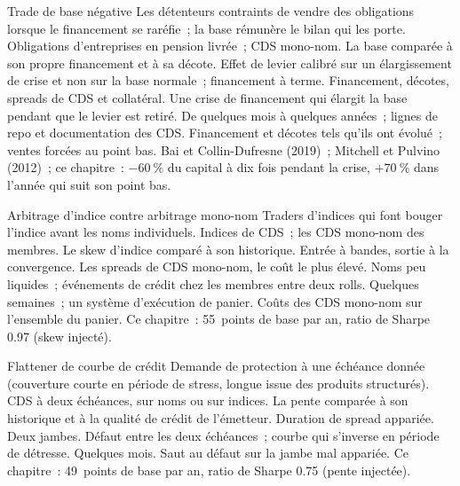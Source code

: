 \begin{strategyfile}{Trade de base négative}\label{strat:s2:credit-relative-value:negbasis}
 Les détenteurs contraints de vendre des obligations lorsque le financement se raréfie~; la base rémunère le bilan qui les porte.
 Obligations d'entreprises en pension livrée~; CDS mono-nom.
 La base comparée à son propre financement et à sa décote.
 Effet de levier calibré sur un élargissement de crise et non sur la base normale~; financement à terme.
 Financement, décotes, spreads de CDS et collatéral.
 Une crise de financement qui élargit la base pendant que le levier est retiré.
 De quelques mois à quelques années~; lignes de repo et documentation des CDS.
 Financement et décotes tels qu'ils ont évolué~; ventes forcées au point bas.
 Bai et Collin-Dufresne (2019)~; Mitchell et Pulvino (2012)~; ce chapitre~: $-60~\%$ du capital à dix fois pendant la crise, $+70~\%$ dans
l'année qui suit son point bas.
\end{strategyfile}

\begin{strategyfile}{Arbitrage d'indice contre arbitrage mono-nom}\label{strat:s2:credit-relative-value:index}
 Traders d'indices qui font bouger l'indice avant les noms individuels.
 Indices de CDS~; les CDS mono-nom des membres.
 Le skew d'indice comparé à son historique.
 Entrée à bandes, sortie à la convergence.
 Les spreads de CDS mono-nom, le coût le plus élevé.
 Noms peu liquides~; événements de crédit chez les membres entre deux rolls.
 Quelques semaines~; un système d'exécution de panier.
 Coûts des CDS mono-nom sur l'ensemble du panier.
 Ce chapitre~: 55~points de base par an, ratio de Sharpe 0.97 (skew injecté).
\end{strategyfile}

\begin{strategyfile}{Flattener de courbe de crédit}\label{strat:s2:credit-relative-value:curve}
 Demande de protection à une échéance donnée (couverture courte en période de stress, longue issue des produits structurés).
 CDS à deux échéances, sur noms ou sur indices.
 La pente comparée à son historique et à la qualité de crédit de l'émetteur.
 Duration de spread appariée.
 Deux jambes.
 Défaut entre les deux échéances~; courbe qui s'inverse en période de détresse.
 Quelques mois.
 Saut au défaut sur la jambe mal appariée.
 Ce chapitre~: 49~points de base par an, ratio de Sharpe 0.75 (pente injectée).
\end{strategyfile}

